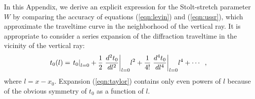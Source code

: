In this Appendix, we derive an explicit expression for the
Stolt-stretch parameter $W$ by comparing the accuracy of equations
(\ref{eqn:levin}) and (\ref{eqn:ussr}), which approximate the
traveltime curve in the neighborhood of the vertical ray. It is
appropriate to consider a series expansion of the diffraction
traveltime in the vicinity of the vertical ray:
\begin{equation}
t_0(l)={\left.t_0\right|_{l=0}}+
{1 \over 2}\,{\left.{d^2t_0}\over {dl^2}\right|_{l=0}}l^2+
{1 \over {4!}}\,{\left.{d^4t_0}\over {dl^4}\right|_{l=0}}l^4+\cdots\;\;,
\label{eqn:taylor} 
\end{equation}
where $l=x-x_0$. 
Expansion (\ref{eqn:taylor}) contains only even powers of $l$ because of 
the obvious symmetry of $t_0$ as a function of $l$. 

